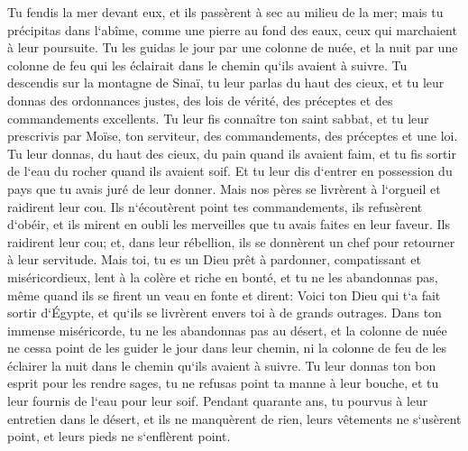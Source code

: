\verse Tu fendis la mer devant eux, et ils passèrent à sec au milieu de la mer; mais tu précipitas dans l`abîme, comme une pierre au fond des eaux, ceux qui marchaient à leur poursuite. 
\verse Tu les guidas le jour par une colonne de nuée, et la nuit par une colonne de feu qui les éclairait dans le chemin qu`ils avaient à suivre. 
\verse Tu descendis sur la montagne de Sinaï, tu leur parlas du haut des cieux, et tu leur donnas des ordonnances justes, des lois de vérité, des préceptes et des commandements excellents. 
\verse Tu leur fis connaître ton saint sabbat, et tu leur prescrivis par Moïse, ton serviteur, des commandements, des préceptes et une loi. 
\verse Tu leur donnas, du haut des cieux, du pain quand ils avaient faim, et tu fis sortir de l`eau du rocher quand ils avaient soif. Et tu leur dis d`entrer en possession du pays que tu avais juré de leur donner. 
\verse Mais nos pères se livrèrent à l`orgueil et raidirent leur cou. Ils n`écoutèrent point tes commandements, 
\verse ils refusèrent d`obéir, et ils mirent en oubli les merveilles que tu avais faites en leur faveur. Ils raidirent leur cou; et, dans leur rébellion, ils se donnèrent un chef pour retourner à leur servitude. Mais toi, tu es un Dieu prêt à pardonner, compatissant et miséricordieux, lent à la colère et riche en bonté, et tu ne les abandonnas pas, 
\verse même quand ils se firent un veau en fonte et dirent: Voici ton Dieu qui t`a fait sortir d`Égypte, et qu`ils se livrèrent envers toi à de grands outrages. 
\verse Dans ton immense miséricorde, tu ne les abandonnas pas au désert, et la colonne de nuée ne cessa point de les guider le jour dans leur chemin, ni la colonne de feu de les éclairer la nuit dans le chemin qu`ils avaient à suivre. 
\verse Tu leur donnas ton bon esprit pour les rendre sages, tu ne refusas point ta manne à leur bouche, et tu leur fournis de l`eau pour leur soif. 
\verse Pendant quarante ans, tu pourvus à leur entretien dans le désert, et ils ne manquèrent de rien, leurs vêtements ne s`usèrent point, et leurs pieds ne s`enflèrent point. 
